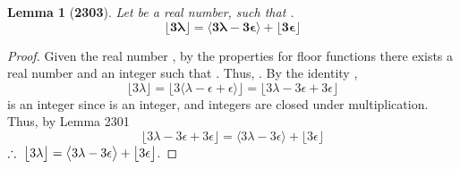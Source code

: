 \documentclass[preview]{standalone}
\newtheorem{lemma}{Lemma}
\begin{document}
\begin{lemma}[\textbf{2303}]
    Let \bm{$\lambda$} be a real number, 
    such that \bm{$\big \lfloor \lambda \big \rfloor + \epsilon = \lambda$}.
    \begin{equation*}
        \bm{
            \big \lfloor 3 \lambda \big \rfloor 
                =
            \big \langle 
                3 \lambda - 3 \epsilon 
            \big \rangle
                +
            \big \lfloor 3 \epsilon \big \rfloor 
        }
    \end{equation*}
\end{lemma}

\begin{proof}
    Given the real number \bm{$\lambda$}, 
    by the properties for floor functions
    there exists a real number \bm{$\epsilon$}
    and an integer \bm{$\lambda - \epsilon$} such that 
    \bm{$\lfloor \lambda \rfloor = \lambda - \epsilon$}.
    Thus, \bm{$\lambda = \lambda - \epsilon + \epsilon$}.
    By the identity \bm{$\lambda$},
    \begin{equation*}
        \Big \lfloor 3 \lambda \Big \rfloor 
            =
        \Big \lfloor 
                3 
                \big \langle 
                    \lambda - \epsilon + \epsilon 
                \big \rangle 
        \Big \rfloor
            =
        \Big \lfloor 
            3 \lambda - 3 \epsilon + 3 \epsilon 
        \Big \rfloor
    \end{equation*}
    \bm{$3 \lambda - 3 \epsilon$} is an integer 
    since \bm{$\lambda - \epsilon$} is an integer, 
    and integers are closed under multiplication.
    Thus, by Lemma 2301
    \begin{equation*} 
        \Big \lfloor 
                3 \lambda - 3 \epsilon + 3 \epsilon 
        \Big \rfloor
            =
        \Big \langle 3 \lambda - 3 \epsilon \Big \rangle
            + 
        \Big \lfloor            
            3 \epsilon 
        \Big \rfloor
    \end{equation*}
    $\therefore \text{\space} \relax{
        \big \lfloor 3 \lambda \big \rfloor 
            =
        \big \langle 
            3 \lambda - 3 \epsilon 
        \big \rangle
            +
        \big \lfloor 3 \epsilon \big \rfloor
    }$.
\end{proof}
\end{document}
